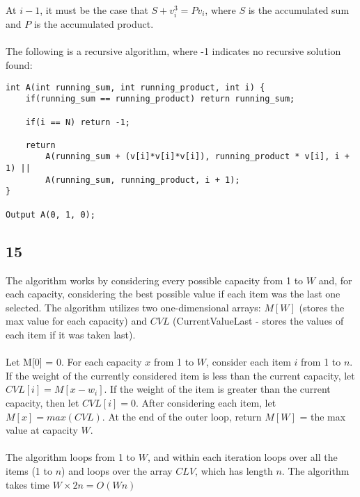 \documentclass[letterpaper,notitlepage,twoside]{article}
\begin{document}
At $i - 1$, it must be the case that $S + v_i^3 = Pv_i$, where $S$ is the accumulated sum and $P$ is the accumulated product.\\\\

The following is a recursive algorithm, where -1 indicates no recursive solution found:
\begin{verbatim}
int A(int running_sum, int running_product, int i) {
    if(running_sum == running_product) return running_sum;
	
    if(i == N) return -1;

    return
        A(running_sum + (v[i]*v[i]*v[i]), running_product * v[i], i + 1) ||
        A(running_sum, running_product, i + 1);		
}

Output A(0, 1, 0);
\end{verbatim}

\subsection*{15}
The algorithm works by considering every possible capacity from 1 to $W$ and, for each capacity, considering the best possible value if each item was the last one selected. The algorithm utilizes two one-dimensional arrays: $M[W]$ (stores the max value for each capacity) and $CVL$ (CurrentValueLast - stores the values of each item if it was taken last). \\ \\
Let M[0] = 0. For each capacity $x$ from 1 to $W$, consider each item $i$ from 1 to $n$. If the weight of the currently considered item is less than the current capacity, let $CVL[i] = M[x - w_i]$. If the weight of the item is greater than the current capacity, then let $CVL[i] = 0$. After considering each item, let $M[x] = max(CVL)$. At the end of the outer loop, return $M[W]$ = the max value at capacity $W$. \\ \\
The algorithm loops from 1 to $W$, and within each iteration loops over all the items (1 to $n$) and loops over the array $CLV$, which has length $n$. The algorithm takes time $W \times 2n = O(Wn)$
\end{document}
